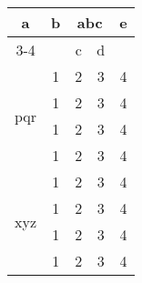 \documentclass[a4paper,12pt]{article}
\begin{document}
\begin{table}[htbp]
\label{Tab:Zadanie}
\begin{center}
\begin{tabular}{c|c|c|c|c}
\hline \multirow{3}{0.5cm}{a} & \multirow{3}{0.5cm}{\centering b} & \multicolumn{2}{|c|}{\centering abc} & \multirow{3}{0.5cm}{\centering e} \\ \cline{3-4}
& & c & d & \\\hline
\multirow{4}{0.5cm}{\centering pqr} & 1 & 2& 3 & 4\\
& 1 & 2& 3 & 4\\
& 1 & 2& 3 & 4\\
& 1 & 2& 3 & 4\\ \hline
\multirow{4}{0.5cm}{\centering xyz} & 1 & 2& 3 & 4\\
& 1 & 2& 3 & 4\\
& 1 & 2& 3 & 4\\
& 1 & 2& 3 & 4\\ \hline

 \end{tabular}
 \end{center}
 \end{table}
\end{document}
